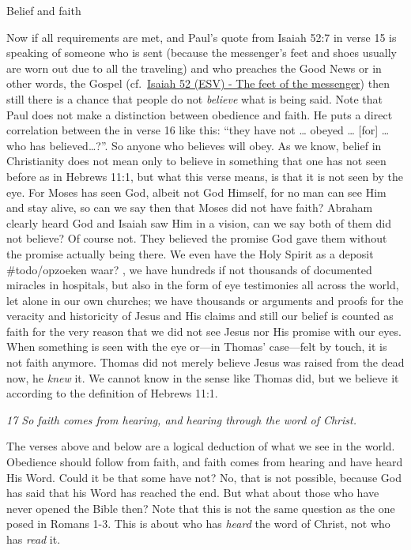 Belief and faith

Now if all requirements are met, and Paul's quote from Isaiah 52:7 in
verse 15 is speaking of someone who is sent (because the messenger's
feet and shoes usually are worn out due to all the traveling) and who
preaches the Good News or in other words, the Gospel
(cf.~\href{bear://x-callback-url/open-note?id=60E171AB-2DA4-4884-A229-0B9E3EE2544A-48930-00019AFB1C102754\&header=The\%20feet\%20of\%20the\%20messenger}{Isaiah
52 (ESV) - The feet of the messenger}) then still there is a chance that
people do not \emph{believe} what is being said. Note that Paul does not
make a distinction between obedience and faith. He puts a direct
correlation between the in verse 16 like this: ``they have not \ldots{}
obeyed \ldots{} {[}for{]} \ldots{} who has believed\ldots?''. So anyone
who believes will obey. As we know, belief in Christianity does not mean
only to believe in something that one has not seen before as in Hebrews
11:1, but what this verse means, is that it is not seen by the eye. For
Moses has seen God, albeit not God Himself, for no man can see Him and
stay alive, so can we say then that Moses did not have faith? Abraham
clearly heard God and Isaiah saw Him in a vision, can we say both of
them did not believe? Of course not. They believed the promise God gave
them without the promise actually being there. We even have the Holy
Spirit as a deposit \#todo/opzoeken waar? , we have hundreds if not
thousands of documented miracles in hospitals, but also in the form of
eye testimonies all across the world, let alone in our own churches; we
have thousands or arguments and proofs for the veracity and historicity
of Jesus and His claims and still our belief is counted as faith for the
very reason that we did not see Jesus nor His promise with our eyes.
When something is seen with the eye or---in Thomas' case---felt by
touch, it is not faith anymore. Thomas did not merely believe Jesus was
raised from the dead now, he \emph{knew} it. We cannot know in the sense
like Thomas did, but we believe it according to the definition of
Hebrews 11:1.

\emph{17 So faith comes from hearing, and hearing through the word of
Christ.}

The verses above and below are a logical deduction of what we see in the
world. Obedience should follow from faith, and faith comes from hearing
and have heard His Word. Could it be that some have not? No, that is not
possible, because God has said that his Word has reached the end. But
what about those who have never opened the Bible then? Note that this is
not the same question as the one posed in Romans 1-3. This is about who
has \emph{heard} the word of Christ, not who has \emph{read} it.

